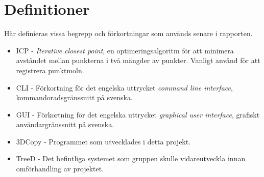 \section{Definitioner}
\label{sec:definitions}
Här definieras vissa begrepp och förkortningar som används senare i rapporten.

\begin{itemize}
	\item ICP - \textit{Iterative closest point}, en optimeringsalgoritm för att minimera avståndet mellan punkterna i två mängder av punkter. Vanligt använd för att registrera punktmoln.
	\item CLI - Förkortning för det engelska uttrycket \textit{command line interface}, kommandoradsgränssnitt på svenska.
	\item GUI - Förkortning för det engelska uttrycket \textit{graphical user interface}, grafiskt användargränssnitt på svenska.
	\item 3DCopy - Programmet som utvecklades i detta projekt.
	\item TreeD - Det befintliga systemet som gruppen skulle vidareutveckla innan omförhandling av projektet.
\end{itemize} 


